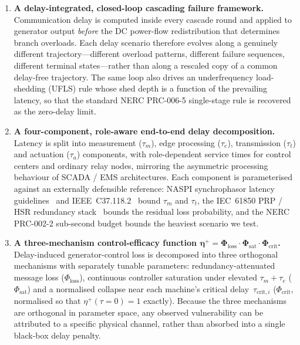 \begin{enumerate}

\item \textbf{A delay-integrated, closed-loop cascading failure
  framework.}  Communication delay is computed inside every cascade
  round and applied to generator output \emph{before} the
  DC power-flow redistribution that determines branch overloads.
  Each delay scenario therefore evolves along a genuinely
  different trajectory---different overload patterns, different
  failure sequences, different terminal states---rather than along
  a rescaled copy of a common delay-free trajectory.  The same
  loop also drives an underfrequency load-shedding (UFLS) rule
  whose shed depth is a function of the prevailing latency, so
  that the standard NERC PRC-006-5 single-stage rule is recovered
  as the zero-delay limit.

\item \textbf{A four-component, role-aware end-to-end delay
  decomposition.}  Latency is split into measurement
  ($\tau_m$), edge processing ($\tau_e$), transmission ($\tau_t$)
  and actuation ($\tau_a$) components, with role-dependent service
  times for control centers and ordinary relay nodes, mirroring
  the asymmetric processing behaviour of SCADA / EMS architectures.
  Each component is parameterised against an externally defensible
  reference: NASPI synchrophasor latency
  guidelines~\citep{NASPI_LatencyGuidelines} and
  IEEE~C37.118.2~\citep{IEEE_C37_118_2} bound $\tau_m$ and
  $\tau_t$, the IEC~61850 PRP / HSR redundancy
  stack~\citep{IEC_61850_PRP} bounds the residual loss
  probability, and the NERC PRC-002-2 sub-second budget
  \citep{NERC_PRC002} bounds the heaviest scenario we test.

\item \textbf{A three-mechanism control-efficacy function
  $\boldsymbol{\eta^{+} = \Phi_{\mathrm{loss}} \cdot
  \Phi_{\mathrm{sat}} \cdot \Phi_{\mathrm{crit}}}$.}  Delay-induced
  generator-control loss is decomposed into three orthogonal
  mechanisms with separately tunable parameters:
  redundancy-attenuated message loss
  ($\Phi_{\mathrm{loss}}$), continuous controller saturation under
  elevated $\tau_m+\tau_e$ ($\Phi_{\mathrm{sat}}$) and a normalised
  collapse near each machine's critical
  delay~$\tau_{\mathrm{crit},i}$ ($\Phi_{\mathrm{crit}}$, normalised
  so that $\eta^{+}(\tau{=}0) = 1$ exactly).  Because the three
  mechanisms are orthogonal in parameter space, any observed
  vulnerability can be attributed to a specific physical channel,
  rather than absorbed into a single black-box delay penalty.


\end{enumerate}
